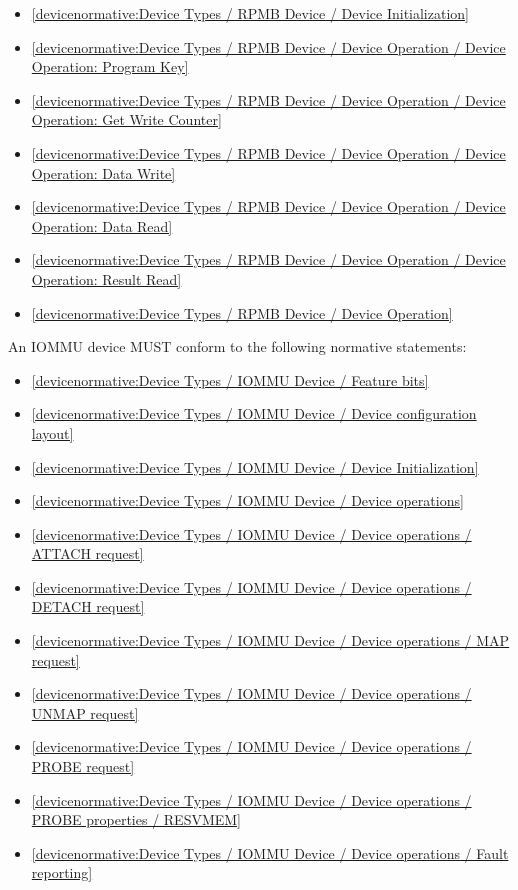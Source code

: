 \begin{itemize}
\item \ref{devicenormative:Device Types / RPMB Device / Device Initialization}
\item \ref{devicenormative:Device Types / RPMB Device / Device Operation / Device Operation: Program Key}
\item \ref{devicenormative:Device Types / RPMB Device / Device Operation / Device Operation: Get Write Counter}
\item \ref{devicenormative:Device Types / RPMB Device / Device Operation / Device Operation: Data Write}
\item \ref{devicenormative:Device Types / RPMB Device / Device Operation / Device Operation: Data Read}
\item \ref{devicenormative:Device Types / RPMB Device / Device Operation / Device Operation: Result Read}
\item \ref{devicenormative:Device Types / RPMB Device / Device Operation}
\end{itemize}

\label{sec:Conformance / Device Conformance / IOMMU Device Conformance}

An IOMMU device MUST conform to the following normative statements:

\begin{itemize}
\item \ref{devicenormative:Device Types / IOMMU Device / Feature bits}
\item \ref{devicenormative:Device Types / IOMMU Device / Device configuration layout}
\item \ref{devicenormative:Device Types / IOMMU Device / Device Initialization}
\item \ref{devicenormative:Device Types / IOMMU Device / Device operations}
\item \ref{devicenormative:Device Types / IOMMU Device / Device operations / ATTACH request}
\item \ref{devicenormative:Device Types / IOMMU Device / Device operations / DETACH request}
\item \ref{devicenormative:Device Types / IOMMU Device / Device operations / MAP request}
\item \ref{devicenormative:Device Types / IOMMU Device / Device operations / UNMAP request}
\item \ref{devicenormative:Device Types / IOMMU Device / Device operations / PROBE request}
\item \ref{devicenormative:Device Types / IOMMU Device / Device operations / PROBE properties / RESVMEM}
\item \ref{devicenormative:Device Types / IOMMU Device / Device operations / Fault reporting}
\end{itemize}

